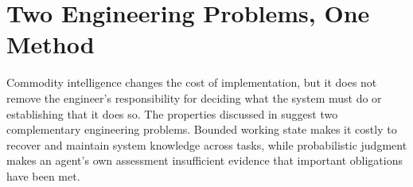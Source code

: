 


\chapter{Two Engineering Problems, One Method}\label{heading:from-the-engineering-problems-to-mage}


Commodity intelligence changes the cost of implementation, but it does not remove the engineer's responsibility for deciding what the system must do or establishing that it does so. The properties discussed in  suggest two complementary engineering problems. Bounded working state makes it costly to recover and maintain system knowledge across tasks, while probabilistic judgment makes an agent's own assessment insufficient evidence that important obligations have been met.







